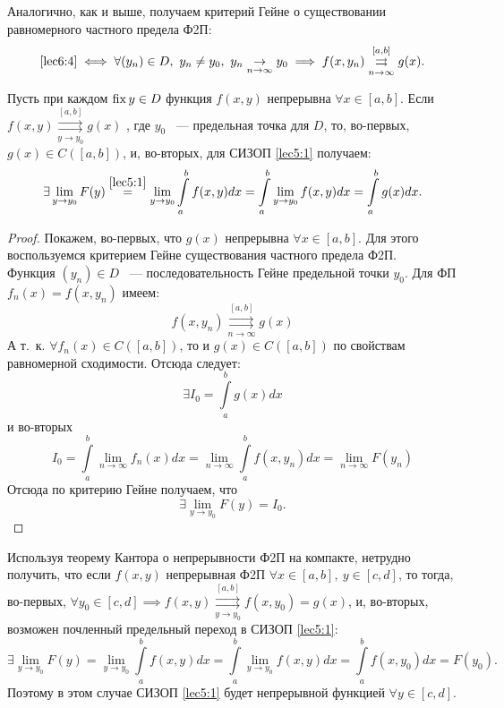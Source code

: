 \documentclass[../../main.tex]{subfiles}
\begin{document}
Аналогично, как и выше, получаем критерий Гейне о 
существовании равномерного частного
предела Ф2П:
\begin{equation}
\label{lec6:5}
\eqref{lec6:4} \iff \forall (y_n) \in D,\ y_n \neq y_0,\ 
y_n \underset{n \to \infty}{\to} y_0 \implies
f(x, y_n) \stackrel{[a, b]}{\underset{n \to \infty}{\rightrightarrows}} g(x).
\end{equation}
\begin{thm}
	Пусть при каждом $ \operatorname{fix} y \in D $ функция $ f(x, y) $ непрерывна 
	$ \forall x \in [a, b] $. Если $
	f(x, y) \stackrel{[a, b]}{\underset{y \to y_0}{\rightrightarrows}} g(x)$
	, где $y_0$ ~--- предельная точка для $ D $, то, во-первых, 
	$ g(x) \in C([a, b]) $, и, во-вторых, для СИЗОП \eqref{lec5:1} получаем:
	\begin{equation}
	\label{lec6:6}
	\exists \lim\limits_{y \to y_0} F(y) \stackrel{\eqref{lec5:1}}{=} 
	\lim\limits_{y \to y_0} \int\limits_a^b f(x, y) dx = 
	\int\limits_a^b \lim\limits_{y \to y_0} f(x, y) dx = 
	\int\limits_a^b g(x) dx.
	\end{equation}
\end{thm}
\begin{proof}
	Покажем, во-первых, что $ g(x) $ непрерывна $ \forall x \in [a, b] $.
	Для этого воспользуемся критерием Гейне существования частного предела Ф2П.
	\\
	Функция $(y_n) \in D$ ~--- последовательность Гейне предельной точки $y_0$.
	Для ФП $ f_n(x) = f(x, y_n) $ имеем:
	\[
	f(x, y_n) \stackrel{[a, b]}{\underset{n \to \infty}{\rightrightarrows}} g(x)
	\]
	А т.~к. $ \forall f_n(x) \in C([a, b])$, то и $ g(x) \in C([a, b]) $ по 
	свойствам равномерной сходимости.
	Отсюда следует:
	\[
	\exists I_0 = \int\limits_a^b g(x) dx
	\]
	и во-вторых
	\[
	I_0 = \int\limits_a^b \lim\limits_{n \to \infty} f_n(x) dx = 
	\lim\limits_{n \to \infty} \int\limits_a^b f(x, y_n) dx = 
	\lim\limits_{n \to \infty} F(y_n)
	\]
	Отсюда по критерию Гейне получаем, что
	\[
	\exists \lim\limits_{y \to y_0} F(y) = I_0.
	\]
\end{proof}
\begin{rem}
	Используя теорему Кантора о непрерывности Ф2П на компакте, нетрудно получить,
	что если $ f(x, y) $ непрерывная Ф2П $ \forall x \in [a, b],\ 
	y \in [c, d] $, то тогда, во-первых, $ \forall y_0 \in [c, d] \implies 
	f(x, y) \stackrel{[a, b]}{\underset{y \to y_0}{\rightrightarrows}} f(x, y_0)
	= g(x)
	$, и, во-вторых, возможен почленный предельный переход 
	в СИЗОП \eqref{lec5:1}:
	\[
	\exists \lim\limits_{y \to y_0} F(y) = 
	\lim\limits_{y \to y_0} \int\limits_a^b f(x, y) dx = 
	\int\limits_a^b \lim\limits_{y \to y_0} f(x, y) dx =
	\int\limits_a^b f(x, y_0) dx = F(y_0).
	\]
	Поэтому в этом случае СИЗОП \eqref{lec5:1} будет непрерывной функцией 
	$ \forall y \in [c, d] $.
\end{rem}
\end{document}
